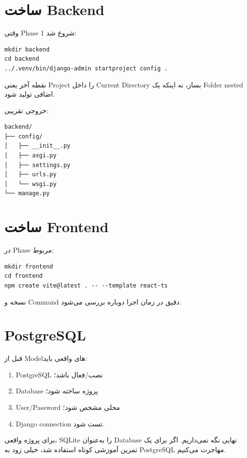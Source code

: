 \section{ساخت Backend}

وقتی Phase 1 شروع شد:

\begin{latin}
\begin{lstlisting}
mkdir backend
cd backend
../.venv/bin/django-admin startproject config .
\end{lstlisting}
\end{latin}

نقطه آخر یعنی Project را داخل Current Directory بساز، نه اینکه یک Folder nested اضافی تولید شود.

خروجی تقریبی:
\begin{latin}
\begin{lstlisting}
backend/
├── config/
│   ├── __init__.py
│   ├── asgi.py
│   ├── settings.py
│   ├── urls.py
│   └── wsgi.py
└── manage.py
\end{lstlisting}
\end{latin}

\section{ساخت Frontend}

در Phase مربوط:

\begin{latin}
\begin{lstlisting}
mkdir frontend
cd frontend
npm create vite@latest . -- --template react-ts
\end{lstlisting}
\end{latin}

نسخه و Command دقیق در زمان اجرا دوباره بررسی می‌شود.

\section{PostgreSQL}

قبل از Modelهای واقعی باید:
\begin{enumerate}
  \item PostgreSQL نصب/فعال باشد؛
  \item Database پروژه ساخته شود؛
  \item User/Password محلی مشخص شود؛
  \item Django connection تست شود.
\end{enumerate}

\begin{warningbox}
برای پروژه واقعی، SQLite را به‌عنوان Database نهایی نگه نمی‌داریم. اگر برای یک تمرین آموزشی کوتاه استفاده شد، خیلی زود به PostgreSQL مهاجرت می‌کنیم.
\end{warningbox}

